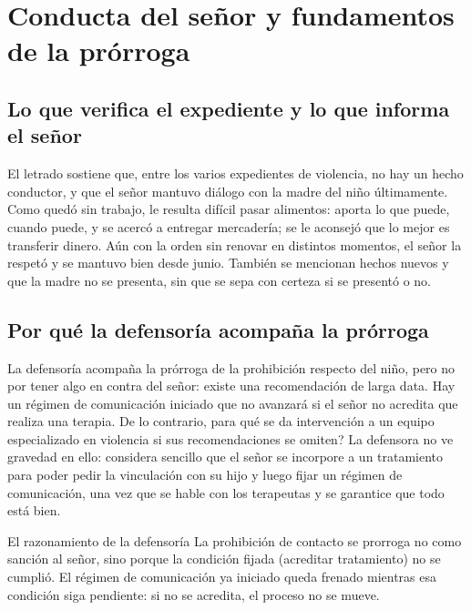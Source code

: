 \documentclass[12pt,oneside]{book}
\begin{document}
\section{Conducta del se\~nor y fundamentos de la pr\'orroga}

\subsection{Lo que verifica el expediente y lo que informa el se\~nor}

El letrado sostiene que, entre los varios expedientes de violencia, no hay un hecho conductor, y que el se\~nor mantuvo di\'alogo con la madre del ni\~no \'ultimamente. Como qued\'o sin trabajo, le resulta dif\'icil pasar alimentos: aporta lo que puede, cuando puede, y se acerc\'o a entregar mercader\'ia; se le aconsej\'o que lo mejor es transferir dinero. A\'un con la orden sin renovar en distintos momentos, el se\~nor la respet\'o y se mantuvo bien desde junio. Tambi\'en se mencionan hechos nuevos y que la madre no se presenta, sin que se sepa con certeza si se present\'o o no.


\subsection{Por qu\'e la defensor\'ia acompa\~na la pr\'orroga}

La defensor\'ia acompa\~na la pr\'orroga de la prohibici\'on respecto del ni\~no, pero no por tener algo en contra del se\~nor: existe una recomendaci\'on de larga data. Hay un r\'egimen de comunicaci\'on iniciado que no avanzar\'a si el se\~nor no acredita que realiza una terapia. De lo contrario, \textquestiondown para qu\'e se da intervenci\'on a un equipo especializado en violencia si sus recomendaciones se omiten? La defensora no ve gravedad en ello: considera sencillo que el se\~nor se incorpore a un tratamiento para poder pedir la vinculaci\'on con su hijo y luego fijar un r\'egimen de comunicaci\'on, una vez que se hable con los terapeutas y se garantice que todo est\'a bien.

\begin{example}{El razonamiento de la defensor\'ia}
La prohibici\'on de contacto se prorroga no como sanci\'on al se\~nor, sino porque la condici\'on fijada (acreditar tratamiento) no se cumpli\'o. El r\'egimen de comunicaci\'on ya iniciado queda frenado mientras esa condici\'on siga pendiente: si no se acredita, el proceso no se mueve.
\end{example}
\end{document}
